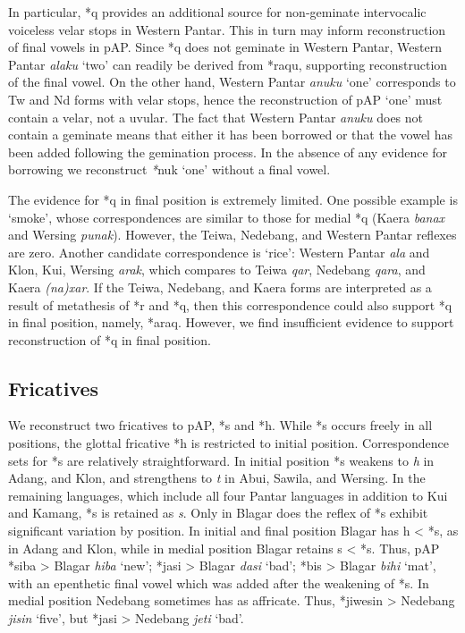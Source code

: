 In particular, *q provides an additional source for non-geminate intervocalic voiceless velar stops in Western Pantar. This in turn may inform reconstruction of final vowels in pAP. Since *q does not geminate in Western Pantar, Western Pantar \textit{alaku} `two' can readily be derived from *raqu, supporting reconstruction of the final vowel. On the other hand, Western Pantar \textit{anuku} `one' corresponds to Tw and Nd forms with velar stops, hence the reconstruction of pAP `one' must contain a velar, not a uvular. The fact that Western Pantar \textit{anuku }does not contain a geminate means that either it has been borrowed or that the vowel has been added following the gemination process. In the absence of any evidence for borrowing we reconstruct \textit{*}nuk `one' without a final vowel.

The evidence for *q in final position is extremely limited. One possible example is `smoke', whose correspondences are similar to those for medial *q (Kaera \textit{banax }and Wersing \textit{punak}). However, the Teiwa, Nedebang, and Western Pantar reflexes are zero. Another candidate correspondence is `rice': Western Pantar \textit{ala} and Klon, Kui, Wersing \textit{arak}, which compares to Teiwa \textit{qar}, Nedebang \textit{qara}, and Kaera \textit{(na)xar}. If the Teiwa, Nedebang, and Kaera forms are interpreted as a result of metathesis of *r and *q, then this correspondence could also support *q in final position, namely, *araq. However, we find insufficient evidence to support reconstruction of *q in final position.

\subsection{Fricatives}
We reconstruct two fricatives to pAP, *s and *h. While *s occurs freely in all positions, the glottal fricative *h is restricted to initial position. Correspondence sets for *s are relatively straightforward. In initial position *s weakens to \textit{h} in Adang, and Klon, and strengthens to \textit{t} in Abui, Sawila, and Wersing. In the remaining languages, which include all four Pantar languages in addition to Kui and Kamang, *s is retained as \textit{s}. Only in Blagar does the reflex of *s exhibit significant variation by position. In initial and final position Blagar has h {\textless} *s, as in Adang and Klon, while in medial position Blagar retains s {\textless} *s. Thus, pAP *siba {\textgreater} Blagar \textit{hiba }`new'; *jasi {\textgreater} Blagar \textit{d{\textyogh}asi }`bad'; *bis {\textgreater} Blagar \textit{bihi} `mat', with an epenthetic final vowel which was added after the weakening of *s. In medial position Nedebang sometimes has as affricate. Thus, *jiwesin {\textgreater} Nedebang \textit{jisin} `five', but *jasi {\textgreater} Nedebang \textit{jet{\textesh}i} `bad'. 

